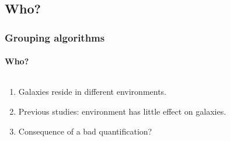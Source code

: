 \documentclass{beamer}
\begin{document}
\subsection{Who?}
\begin{frame}

    \frametitle{Grouping algorithms}
    \framesubtitle{Who?}

    \begin{columns}
        \begin{column}{0.5\textwidth}
            \begin{block}{}
                \begin{enumerate}
                    \item<1-> Galaxies reside in different environments.
                    \item<2-> Previous studies: environment has little effect on galaxies.
                    \item<3-> Consequence of a bad quantification?
                \end{enumerate}
            \end{block}
        \end{column}
        \begin{column}{0.5\textwidth}
        \end{column}
    \end{columns}

\end{frame}

\end{document}
